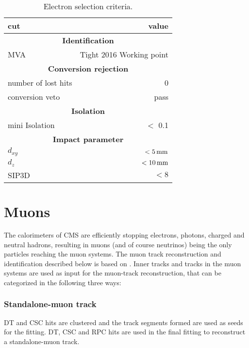 \begin{table}[ht!]
\def\arraystretch{1.2}
    \caption{Electron selection criteria.}
    \label{tab:electrons}
    \begin{center}
        \begin{tabular}{ l r}
        \hline \hline
        cut &  value                             \\ \hline
        \multicolumn{2}{c}{\textbf{Identification}}                \\
        MVA &  Tight 2016 Working point    \\
        \multicolumn{2}{c}{\textbf{Conversion rejection}}                \\
        number of lost hits & 0 \\
        conversion veto & pass \\                          
        \multicolumn{2}{c}{\textbf{Isolation}}                \\
        mini Isolation  &  $<$ 0.1                         \\
        \multicolumn{2}{c}{\textbf{Impact parameter}}                \\
        $d_{xy}$ & $<5\,\text{mm}$ \\
        $d_{z}$ & $<10\,\text{mm}$ \\
        SIP3D    & $< 8$ \\
\hline\hline
\end{tabular}
\end{center}
\end{table}                                                                                       
\section{Muons}\label{sec:muons}
\noindent\justify
The calorimeters of CMS are efficiently stopping electrons, photons, charged and neutral hadrons, resulting in muons (and of course neutrinos) being the only particles reaching the muon systems.  
The muon track reconstruction and identification described below is based on \cite{Sirunyan:2018fpa}. 
Inner tracks and tracks in the muon systems are used as input for the muon-track reconstruction, that can be categorized in the following three ways:
\subsubsection*{Standalone-muon track}
\noindent\justify
DT and CSC hits are clustered and the track segments formed are used as seeds for the fitting. DT, CSC and RPC hits are used in the final fitting to reconstruct a standalone-muon track.
